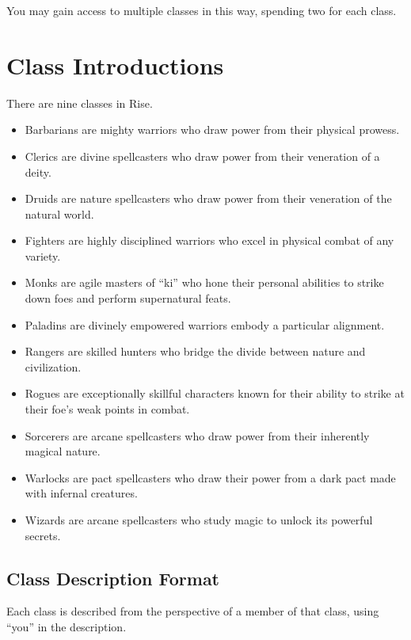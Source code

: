             You may gain access to multiple classes in this way, spending two  for each class.

\section{Class Introductions}

    There are nine classes in Rise.
    \begin{itemize}
        \item Barbarians are mighty warriors who draw power from their physical prowess.
        \item Clerics are divine spellcasters who draw power from their veneration of a deity.
        \item Druids are nature spellcasters who draw power from their veneration of the natural world.
        \item Fighters are highly disciplined warriors who excel in physical combat of any variety.
        \item Monks are agile masters of ``ki'' who hone their personal abilities to strike down foes and perform supernatural feats.
        \item Paladins are divinely empowered warriors embody a particular alignment.
        \item Rangers are skilled hunters who bridge the divide between nature and civilization.
        \item Rogues are exceptionally skillful characters known for their ability to strike at their foe's weak points in combat.
        \item Sorcerers are arcane spellcasters who draw power from their inherently magical nature.
        \item Warlocks are pact spellcasters who draw their power from a dark pact made with infernal creatures.
        \item Wizards are arcane spellcasters who study magic to unlock its powerful secrets.
    \end{itemize}

    \subsection{Class Description Format}
        Each class is described from the perspective of a member of that class, using ``you'' in the description.

